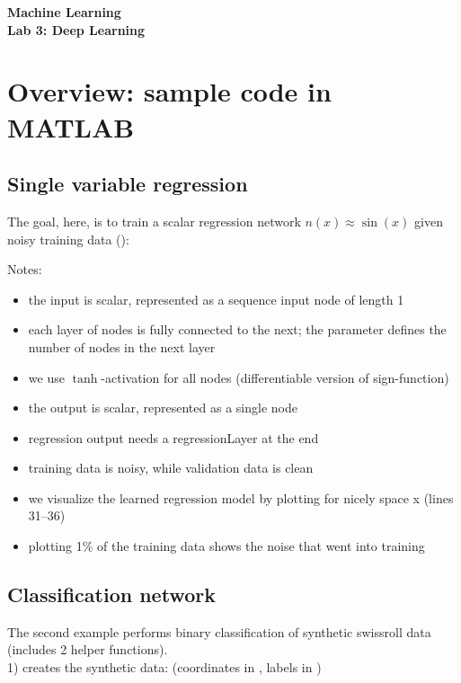 \documentclass[11pt,noanswers,addpoints]{exam}
\begin{document}
{\Large{\textbf{Machine Learning}}} \\[2mm]
\textbf{\Huge{Lab 3: Deep Learning}}\\[2mm]

\section{Overview: sample code in MATLAB}

\subsection{Single variable regression}
The goal, here, is to train a scalar regression network $n(x) \approx \sin(x)$ given noisy training data ():


%

Notes:
\begin{itemize}
\item the input is scalar, represented as a sequence input node of length 1
\item each layer of nodes is fully connected to the next; the parameter defines the number of nodes in the next layer
\item we use $\tanh$-activation for all nodes (differentiable version of sign-function)
\item the output is scalar, represented as a single node
\item regression output needs a regressionLayer at the end
\item training data is noisy, while validation data is clean
\item we visualize the learned regression model by plotting for nicely space x (lines 31--36)
\item plotting 1\% of the training data shows the noise that went into training
\end{itemize}


\subsection{Classification network}
The second example performs binary classification of synthetic swissroll data (includes 2 helper functions).\\

1)  creates the synthetic data: (coordinates in , labels in )
\bigskip
\end{document}
